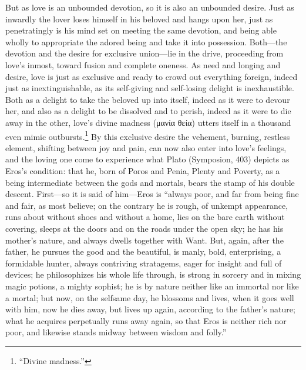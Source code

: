 \documentclass[12pt,a4paper]{book}
\begin{document}
But as love is an unbounded devotion, so it is also an unbounded desire.
Just as inwardly the lover loses himself in his beloved and hangs upon
her, just as penetratingly is his mind set on meeting the same devotion,
and being able wholly to appropriate the adored being and take it into
possession. Both---the devotion and the desire for exclusive union---lie in
the drive, proceeding from love's inmost, toward fusion and complete
oneness. As need and longing and desire, love is just as exclusive and
ready to crowd out everything foreign, indeed just as inextinguishable, as
its self-giving and self-losing delight is inexhaustible. Both as a delight
to take the beloved up into itself, indeed as it were to devour her, and
also as a delight to be dissolved and to perish, indeed as it were to die
away in the other, love's divine madness (μανία θεία) utters
itself in a thousand even mimic outbursts.\footnote{``Divine madness.''} By
this exclusive desire the vehement, burning, restless element, shifting
between joy and pain, can now also enter into love's feelings, and the
loving one come to experience what Plato (Symposion, 403) depicts as
Eros's condition: that he, born of Poros and Penia, Plenty and Poverty, as
a being intermediate between the gods and mortals, bears the stamp of his
double descent. First---so it is said of him---Eros is ``always poor, and
far from being fine and fair, as most believe; on the contrary he is rough,
of unkempt appearance, runs about without shoes and without a home, lies on
the bare earth without covering, sleeps at the doors and on the roads under
the open sky; he has his mother's nature, and always dwells together with
Want. But, again, after the father, he pursues the good and the beautiful,
is manly, bold, enterprising, a formidable hunter, always contriving
stratagems, eager for insight and full of devices; he philosophizes his
whole life through, is strong in sorcery and in mixing magic potions, a
mighty sophist; he is by nature neither like an immortal nor like a mortal;
but now, on the selfsame day, he blossoms and lives, when it goes well with
him, now he dies away, but lives up again, according to the father's
nature; what he acquires perpetually runs away again, so that Eros is
neither rich nor poor, and likewise stands midway between wisdom and
folly.''
\end{document}
